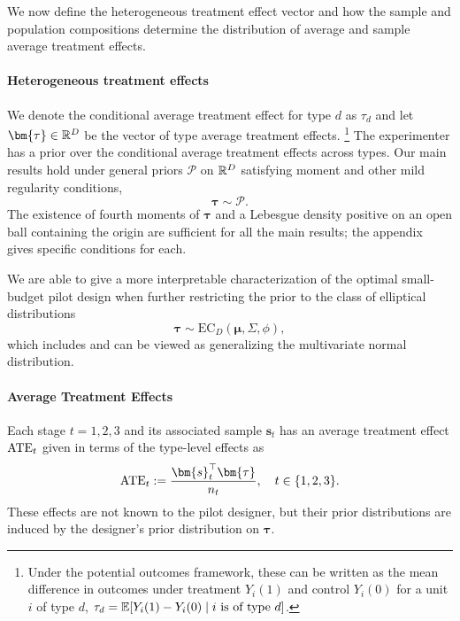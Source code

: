 We now define the heterogeneous treatment effect vector and how the sample and population compositions determine the distribution of average and sample average treatment effects.

\paragraph{Heterogeneous treatment effects}
We denote the conditional average treatment effect for type $d$ as $\tau_d$ and
let $\bm{\tau}\in\R^D$ be the vector of type average treatment effects.%
\footnote{
  Under the potential outcomes framework, these can be written as the mean
  difference in outcomes under treatment $Y_{i}(1)$ and control $Y_{i}(0)$ for a
  unit $i$ of type $d$, $\tau_d = \mathbb{E}[Y_{i}(1) - Y_{i}(0) \mid i \text{ is of
  type } d]$.
}
The experimenter has a prior over the conditional average treatment effects across types.
Our main results hold under general priors $\mathcal{P}$ on $\mathbb{R}^D$ satisfying moment and other mild regularity conditions,
\[
  \bm{\tau}\sim\mathcal{P}.
\]
The existence of fourth moments of $\bm\tau$ and a Lebesgue density positive on an open ball containing the origin are sufficient for all the main results; the appendix gives specific conditions for each.

We are able to give a more interpretable characterization of the optimal small-budget pilot design when further restricting the prior to the class of elliptical distributions~\cite{FangKo90}
\[
  \bm{\tau}\sim\mathrm{EC}_D(\bm{\mu},\Sigma,\phi),
\]
which includes and can be viewed as generalizing the multivariate normal distribution.

\paragraph{Average Treatment Effects}
Each stage $t=1,2,3$ and its associated sample $\bm{s}_t$ has an average treatment effect $\mathrm{ATE}_t$ given in terms of the type-level effects as
\[
  \ATE_t \defeq \frac{\bm{s}_t^{\top}\bm{\tau}}{n_t},
  \quad t\in\{1,2,3\}.
\]
These effects are not known to the pilot designer, but their prior distributions are induced by the designer's prior distribution on $\bm\tau$.


